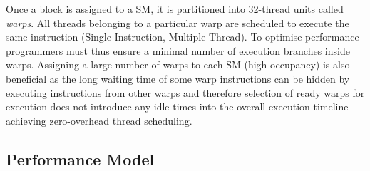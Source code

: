 \documentclass[1p]{elsarticle}
\begin{document}
Once a block is assigned to a SM, it is partitioned into 32-thread units called {\em warps}. All threads belonging to a particular warp are scheduled to execute the same instruction (Single-Instruction, Multiple-Thread). To optimise performance programmers must thus ensure a minimal number of execution branches inside warps. Assigning a large number of warps to each SM (high occupancy) is also beneficial as the long waiting time of some warp instructions can be hidden by executing instructions from other warps and therefore selection of ready warps for execution does not introduce any idle times into the overall execution timeline - achieving zero-overhead thread scheduling. 

\subsection{Performance Model}
\label{sec:model}
\end{document}
